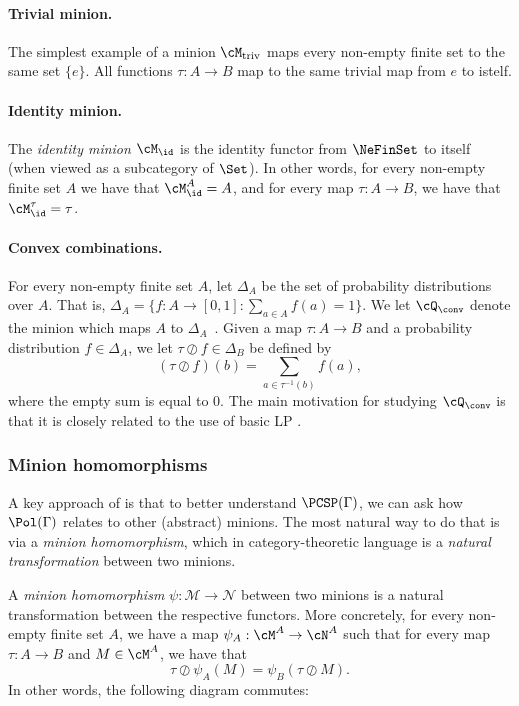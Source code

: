 {
\paragraph{Trivial minion.} The simplest example of a minion $\cM_{\operatorname{triv}}$ maps every non-empty finite set to the same set $\{e\}$. All functions $\tau : A \to B$ map to the same trivial map from $e$ to istelf.
}

{
\paragraph{Identity minion.} {The \emph{identity minion} $\cM_{\id}$ is the identity functor from $\NeFinSet$ to itself (when viewed as a subcategory of $\Set$). In other words, for every non-empty finite set $A$ we have that $\cM_{\id}^A = A$, and for every map $\tau : A \to B$, we have that $\cM_{\id}^\tau = \tau$.}
}

{
\paragraph{Convex combinations.} For every non-empty finite set $A$, let $\Delta_A$ be the set of probability distributions over $A$. That is, $\Delta_A = \{f : A \to [0,1] : \sum_{a\in A} f(a) = 1\}.$ We let $\cQ_{\conv}$ denote the minion which maps $A$ to $\Delta_A$~\cite{BBKO21}. Given a map $\tau : A \to B$ and a probability distribution $f \in \Delta_A$, we let $\tau \oslash f \in \Delta_B$ be defined by 
\[
    (\tau \oslash f)(b) = \sum_{a \in \tau^{-1}(b)} f(a),
\]
where the empty sum is equal to $0$. The main motivation for studying $\cQ_{\conv}$ is that it is closely related to the use of basic LP \cite{BBKO21}.
}

\subsubsection{{Minion homomorphisms}}

{
A key approach of \cite{BBKO21} is that to better understand $\PCSP(\Gamma)$, we can ask how $\Pol(\Gamma)$ relates to other (abstract) minions. The most natural way to do that is via a \emph{minion homomorphism}, which in category-theoretic language is a \emph{natural transformation} between two minions.}

\begin{definition}
A \emph{minion homomorphism} $\psi: \mathcal M \to \mathcal N$ between two minions {is a natural transformation between the respective functors. More concretely, for every non-empty finite set $A$, we have a map $\psi_A : \cM^A \to \cN^A$ such that for every map $\tau : A \to B$ and $M \in \cM^A$, we have that}
\[
    {\tau \oslash \psi_A(M) = \psi_B(\tau \oslash M).}
\]
In other words, the following diagram commutes:
\begin{center}
\end{center}
\end{definition}

